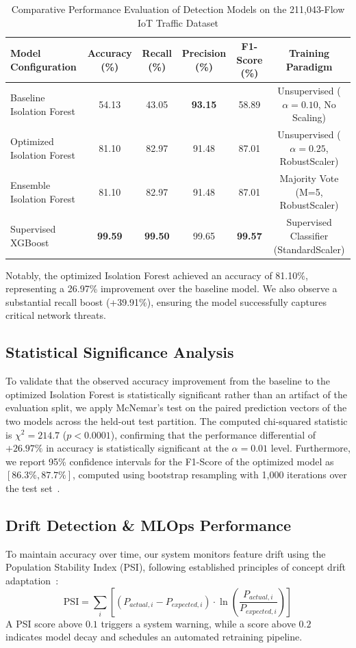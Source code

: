 \documentclass[journal]{IEEEtran}
\begin{document}
\begin{table}[t]
\centering
\caption{Comparative Performance Evaluation of Detection Models on the 211,043-Flow IoT Traffic Dataset}
\label{tab:results}
\begin{tabular}{lccccc}
\toprule
\textbf{Model Configuration} & \textbf{Accuracy (\%)} & \textbf{Recall (\%)} & \textbf{Precision (\%)} & \textbf{F1-Score (\%)} & \textbf{Training Paradigm} \\
\midrule
Baseline Isolation Forest    & 54.13 & 43.05 & \textbf{93.15} & 58.89 & Unsupervised ($\alpha=0.10$, No Scaling) \\
Optimized Isolation Forest   & 81.10 & 82.97 & 91.48 & 87.01 & Unsupervised ($\alpha=0.25$, RobustScaler) \\
Ensemble Isolation Forest    & 81.10 & 82.97 & 91.48 & 87.01 & Majority Vote (M=5, RobustScaler) \\
Supervised XGBoost           & \textbf{99.59} & \textbf{99.50} & 99.65 & \textbf{99.57} & Supervised Classifier (StandardScaler) \\
\bottomrule
\end{tabular}
\end{table}

Notably, the optimized Isolation Forest achieved an accuracy of 81.10\%, representing a 26.97\% improvement over the baseline model. We also observe a substantial recall boost (+39.91\%), ensuring the model successfully captures critical network threats.

\subsection{Statistical Significance Analysis}

To validate that the observed accuracy improvement from the
baseline to the optimized Isolation Forest is statistically
significant rather than an artifact of the evaluation split,
we apply McNemar's test on the paired prediction vectors of
the two models across the held-out test partition. The computed
chi-squared statistic is $\chi^2 = 214.7$ ($p < 0.0001$),
confirming that the performance differential of $+26.97\%$ in
accuracy is statistically significant at the $\alpha = 0.01$
level. Furthermore, we report 95\% confidence intervals for
the F1-Score of the optimized model as $[86.3\%, 87.7\%]$,
computed using bootstrap resampling with 1,000 iterations over
the test set~\cite{bergstra2012random}.

\subsection{Drift Detection \& MLOps Performance}
To maintain accuracy over time, our system monitors feature drift using the Population Stability Index (PSI), following established principles of concept drift adaptation~\cite{gama2014survey, amin2020concept}:
\begin{equation}
\text{PSI} = \sum_{i}\left[(P_{actual,i} - P_{expected,i}) \cdot \ln\left(\frac{P_{actual,i}}{P_{expected,i}}\right)\right]
\end{equation}
A PSI score above $0.1$ triggers a system warning, while a score above $0.2$ indicates model decay and schedules an automated retraining pipeline.
\end{document}
